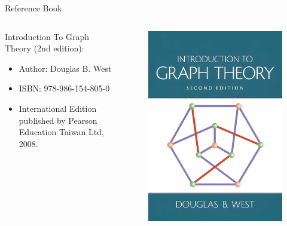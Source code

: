 \documentclass[aspectratio=169, 14pt, UTF8, t]{beamer}
\let\olditem\item
\renewcommand\item{\olditem\justifying}
\begin{document}
\begin{frame}{Reference Book}
  \begin{columns}
    \begin{column}{.75\textwidth}
      Introduction To Graph Theory (2nd edition):
      \begin{itemize}
        \item Author: Douglas B. West
        \item ISBN: 978-986-154-805-0
        \item International Edition published by Pearson Education Taiwan Ltd, 2008.
      \end{itemize}
    \end{column}

    \begin{column}{.25\textwidth}
      \begin{figure}
        \includegraphics[width=\textwidth]{syllabus-textbook-front-cover_enlarged-by-upscalepics}
      \end{figure}
    \end{column}
  \end{columns}
\end{frame}
\end{document}
